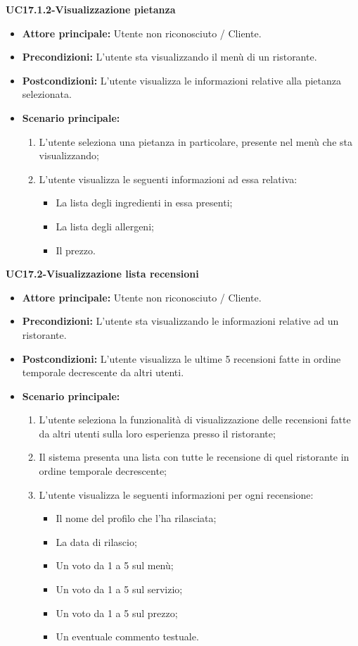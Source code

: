 \textbf{UC17.1.2-Visualizzazione pietanza}
\begin{itemize}
\item \textbf{Attore principale:} Utente non riconosciuto / Cliente.
\item \textbf{Precondizioni:} L'utente sta visualizzando il menù di un ristorante.
\item \textbf{Postcondizioni:} L'utente visualizza le informazioni relative alla pietanza selezionata.
\item \textbf{Scenario principale:}
\begin{enumerate}
    \item L'utente seleziona una pietanza in particolare, presente nel menù che sta visualizzando;
    \item L'utente visualizza le seguenti informazioni ad essa relativa:
    \begin{itemize}
        \item La lista degli ingredienti in essa presenti;
        \item La lista degli allergeni;
        \item Il prezzo.
    \end{itemize}
\end{enumerate}
\end{itemize}

\pagebreak
\textbf{UC17.2-Visualizzazione lista recensioni}
\begin{itemize}
\item \textbf{Attore principale:} Utente non riconosciuto / Cliente.
\item \textbf{Precondizioni:} L'utente sta visualizzando le informazioni relative ad un ristorante.
\item \textbf{Postcondizioni:} L'utente visualizza le ultime 5 recensioni fatte in ordine temporale decrescente da altri utenti.
\item \textbf{Scenario principale:}
\begin{enumerate}
    \item L'utente seleziona la funzionalità di visualizzazione delle recensioni fatte da altri utenti
    sulla loro esperienza presso il ristorante;
    \item Il sistema presenta una lista con tutte le recensione di quel ristorante in ordine temporale decrescente;
    \item L'utente visualizza le seguenti informazioni per ogni recensione:
    \begin{itemize}
        \item Il nome del profilo che l'ha rilasciata;
        \item La data di rilascio;
        \item Un voto da 1 a 5 sul menù;
        \item Un voto da 1 a 5 sul servizio;
        \item Un voto da 1 a 5 sul prezzo;
        \item Un eventuale commento testuale.
    \end{itemize}
\end{enumerate}
\end{itemize}


